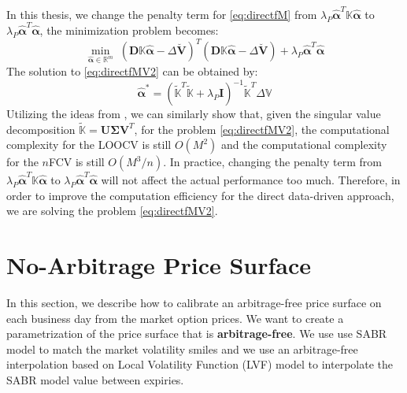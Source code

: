 \documentclass[letterpaper,12pt,titlepage,oneside,final]{book}
\numberwithin{equation}{section}
\theoremstyle{definition}
\newcommand{\Real}{\mathbb{R}}
\newcommand{\valpha}{\pmb{\widehat{\alpha}}}
\newcommand{\vK}{\mathbb{K}}
\newcommand{\vV}{\pmb{\breve{V}}}
\newcommand{\vecVmkt}{\mathbb{V}}
\begin{document}
In this thesis, we change the penalty term for \eqref{eq:directfM} from $\lambda_P \valpha^T\vK\valpha$ to $\lambda_P \valpha^T\valpha$, the minimization problem becomes:
\begin{equation}
\min_{\valpha \in \Real^m} \; ( \pmb{D} \vK \valpha - \Delta\vV)^T (\pmb{D}  \vK \valpha -\Delta\vV)+ \lambda_P \valpha^T\valpha
\label{eq:directfMV2}
\end{equation}
The solution to \eqref{eq:directfMV2} can be obtained by:
\[
\valpha^* = (\widetilde{\vK}^T\widetilde{\vK}  + \lambda_P \pmb{I})^{-1} \widetilde{\vK}^T \Delta \vecVmkt
\]
Utilizing the ideas from \cite{pahikkala2006fast, wahba1990spline}, we can similarly show that,  given the singular value decomposition ${\widetilde{\vK}}=\pmb{U} \pmb{\Sigma} \pmb{V}^T$, for the problem \eqref{eq:directfMV2},  the computational complexity for the LOOCV is still $O(M^2)$ and the computational complexity for the $n$FCV is still $O(M^3/n)$. In practice, changing the penalty term from $\lambda_P \valpha^T\vK\valpha$ to $\lambda_P \valpha^T\valpha$ will not affect the actual performance too much. Therefore, in order to improve the computation efficiency for the direct data-driven approach, we are solving the problem \eqref{eq:directfMV2}.


\chapter{No-Arbitrage Price Surface}
\label{sec:NoArb}
In this section, we describe how to calibrate an arbitrage-free price surface on each business day from the market option prices. We want to create a parametrization of the price surface that is \textbf{arbitrage-free}.  We use use SABR model to match the market volatility smiles and we use an arbitrage-free interpolation based on Local Volatility Function (LVF) model to interpolate the SABR model value between expiries.
\end{document}
